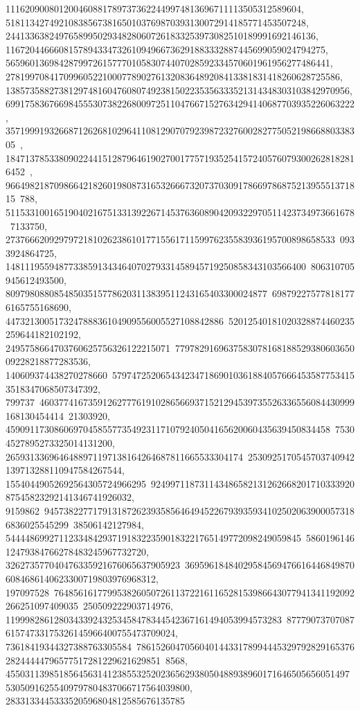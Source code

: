 {{{   1116209008012004608817897373622449974813696711113505312589604, 
   51811342749210838567381650103769870393130072914185771453507248, 
   2441336382497658995029348280607261833253973082510189991692146136, 
   116720446660815789433473261094966736291883332887445699059024794275, 
   5659601369842879972615777010583074407028592334570601961956277486441, 
   278199708417099605221000778902761320836489208413381831418260628725586, 
   13857358827381297481604760807492381502235356333521314348303103842970956, 
   699175836766984555307382268009725110476671527634294140687703935226063222, 
   35719991932668712626810296411081290707923987232760028277505219866880338305\
, 
   1847137853380902244151287964619027001775719352541572405760793002628182816452\
, 
   96649821870986642182601980873165326667320737030917866978687521395551371815\
788, 511533100165190402167513313922671453763608904209322970511423734973661678\
7133750, 27376662092979721810262386101771556171159976235583936195700898658533\
0933924864725, 14811195594877338591343464070279331458945719250858343103566400\
806310705945612493500, 809798088085485035157786203113839511243165403300024877\
698792275778181776165755168690, 447321300517324788836104909556005527108842886\
52012540181020328874460235259644182102192, 2495758664703760625756326122215071\
779782916963758307816818852938060365009228218877283536, 140609374438270278660\
579747252065434234718690103618840576664535877534153518347068507347392, 799737\
46037741673591262777619102865669371521294539735526336556084430999168130454414\
21303920, 4590911730860697045855773549231171079240504165620060435639450834458\
75304527895273325014131200, 2659313369646488971197138164264687811665533304174\
2530925170545703740942139713288110947584267544, 15540449052692564305724966295\
92499711873114348658213126266820171033392087545823292141346741926032, 9159862\
94573822771791318726239358564649452267939359341025020639000573186836025545299\
38506142127984, 5444486992711233484293719183223590183221765149772098249059845\
586019614612479384766278483245967732720, 326273577040476335921676065637905923\
369596184840295845694766164468498706084686140623300719803976968312, 197097528\
76485616177995382605072611372216116528153986643077941341192092266251097409035\
250509222903714976, 119998286128034339243253458478344542367161494053994573283\
8777907370708761574733175326145966400755473709024, 73618419344327388763305584\
78615260470560401443317899444532979282916537628244444796577517281229621629851\
8568, 45503113985185645631412385532520236562938050488938960171646505656051497\
53050916255409797804837066717564039800, 2833133445333520596804812585676135785\
}}}

